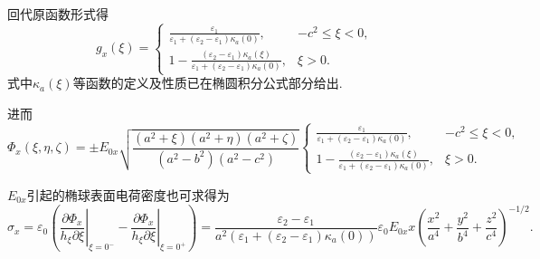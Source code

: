 回代原函数形式得
\begin{equation*}
	g_x(\xi) =
	\begin{cases}
		\displaystyle\frac{\varepsilon_1 }{\varepsilon_1 + (\varepsilon_2 - \varepsilon_1)\kappa_a(0)},                                    & -c^2 \leq \xi < 0, \\[8pt]
		\displaystyle 1 - \frac{(\varepsilon_2 - \varepsilon_1)\kappa_a(\xi)}{\varepsilon_1 + (\varepsilon_2 - \varepsilon_1)\kappa_a(0)}, & \xi > 0.
	\end{cases}
\end{equation*}
式中\(\kappa_a(\xi)\)等函数的定义及性质已在椭圆积分公式部分给出.

进而
\begin{equation}
	\Phi_x(\xi, \eta, \zeta)=\pm E_{0x}\sqrt{\frac{(a^2+\xi)(a^2+\eta)(a^2+\zeta)}{(a^2-b^2)(a^2-c^2)}}\begin{cases}
		\displaystyle\frac{\varepsilon_1 }{\varepsilon_1 + (\varepsilon_2 - \varepsilon_1)\kappa_a(0)},                                    & -c^2 \leq \xi < 0, \\[8pt]
		\displaystyle 1 - \frac{(\varepsilon_2 - \varepsilon_1)\kappa_a(\xi)}{\varepsilon_1 + (\varepsilon_2 - \varepsilon_1)\kappa_a(0)}, & \xi > 0.
	\end{cases}
\end{equation}

\(E_{0x}\)引起的椭球表面电荷密度也可求得为
\begin{equation}
	\sigma_x = \varepsilon_0 \left(
	\left. \frac{\partial \Phi_x}{h_\xi \partial \xi} \right|_{\xi = 0^-} -
	\left. \frac{\partial \Phi_x}{h_\xi \partial \xi} \right|_{\xi = 0^+}
	\right) = \frac{\varepsilon_2 - \varepsilon_1}{a^2 \left( \varepsilon_1 + (\varepsilon_2 - \varepsilon_1) \kappa_a(0) \right)} \varepsilon_0 E_{0x} x \left( \frac{x^2}{a^4} + \frac{y^2}{b^4} + \frac{z^2}{c^4} \right)^{-1/2}.
\end{equation}


